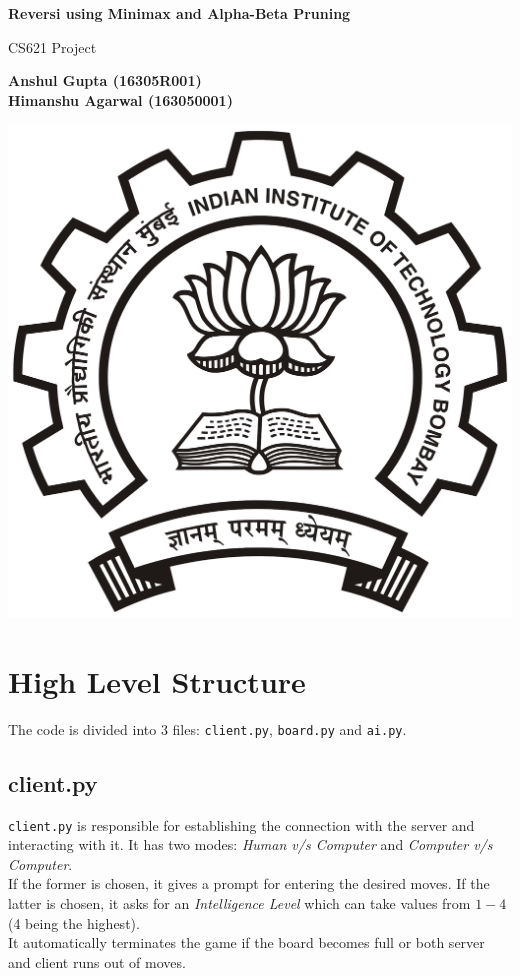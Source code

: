 \documentclass[a4paper,10pt]{article}
\begin{document}
\begin{titlepage}
\begin{center}
\vspace*{1cm}

\huge{\textbf{Reversi using Minimax and Alpha-Beta Pruning}}

\vspace{0.5cm}
CS621 Project

\vspace{1.5cm}

\Large{\textbf{Anshul Gupta (16305R001) \\ Himanshu Agarwal (163050001)}}

\vfill

\vspace{0.8cm}

\includegraphics[scale=0.05]{IITB.png}
\end{center}
\end{titlepage}
 
\section*{High Level Structure}
The code is divided into 3 files: \texttt{client.py}, \texttt{board.py} and \texttt{ai.py}.

\subsection*{client.py}
\texttt{client.py} is responsible for establishing the connection with the server and interacting with it. It has two modes: \textit{Human v/s Computer} and \textit{Computer v/s Computer}.\\[0.2cm]
If the former is chosen, it gives a prompt for entering the desired moves. If the latter is chosen, it asks for an \textit{Intelligence Level} which can take values from $1 - 4$ (4 being the highest).\\[0.2cm]
It automatically terminates the game if the board becomes full or both server and client runs out of moves.
\end{document}
